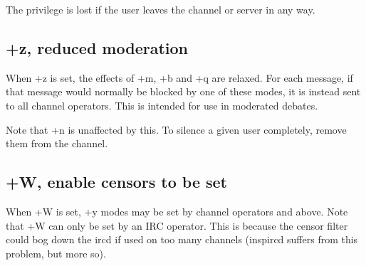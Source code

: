 	The privilege is lost if the user leaves the channel or server in any
	way.


\subsection{+z, reduced moderation}

	When +z is set, the effects of +m, +b and +q are relaxed. For each
	message, if that message would normally be blocked by one of these
	modes, it is instead sent to all channel operators. This is intended
	for use in moderated debates.

	Note that +n is unaffected by this. To silence a given user completely,
	remove them from the channel.


\subsection{+W, enable censors to be set}

	When +W is set, +y modes may be set by channel operators and above.
	Note that +W can only be set by an IRC operator. This is because the
	censor filter could bog down the ircd if used on too many channels
	(inspircd suffers from this problem, but more so).
